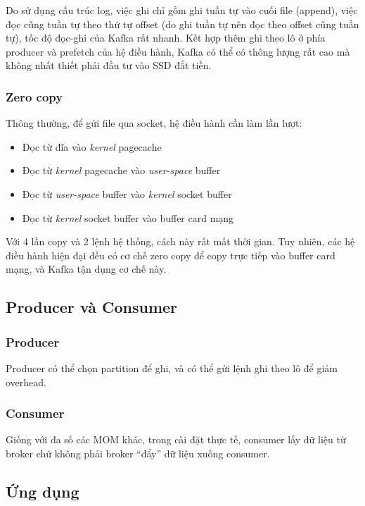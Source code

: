 \documentclass{article}
\begin{document}
Do sử dụng cấu trúc log, việc ghi chỉ gồm ghi tuần tự vào cuối file (append),
việc đọc cũng tuần tự theo thứ tự offset (do ghi tuần tự nên đọc theo offset
cũng tuần tự), tốc độ đọc-ghi của Kafka rất nhanh. Kết hợp thêm ghi theo lô ở
phía producer và prefetch của hệ điều hành, Kafka có thể có thông lượng rất cao
mà không nhất thiết phải đầu tư vào SSD đắt tiền.

\subsubsection{Zero copy}

Thông thường, để gửi file qua socket, hệ điều hành cần làm lần lượt:

\begin{itemize}
    \item Đọc từ đĩa vào \emph{kernel} pagecache
    \item Đọc từ \emph{kernel} pagecache vào \emph{user-space} buffer
    \item Đọc từ \emph{user-space} buffer vào \emph{kernel} socket buffer
    \item Đọc từ \emph{kernel} socket buffer vào buffer card mạng
\end{itemize}

Với 4 lần copy và 2 lệnh hệ thống, cách này rất mất thời gian. Tuy nhiên, các hệ
điều hành hiện đại đều có cơ chế zero copy để copy trực tiếp vào buffer card
mạng, và Kafka tận dụng cơ chế này.

\subsection{Producer và Consumer}

\subsubsection{Producer}

Producer có thể chọn partition để ghi, và có thể gửi lệnh ghi theo lô để giảm
overhead.

\subsubsection{Consumer}

Giống với đa số các MOM khác, trong cài đặt thực tế, consumer lấy dữ liệu từ
broker chứ không phải broker ``đẩy'' dữ liệu xuống consumer.

\subsection{Ứng dụng}
\end{document}
